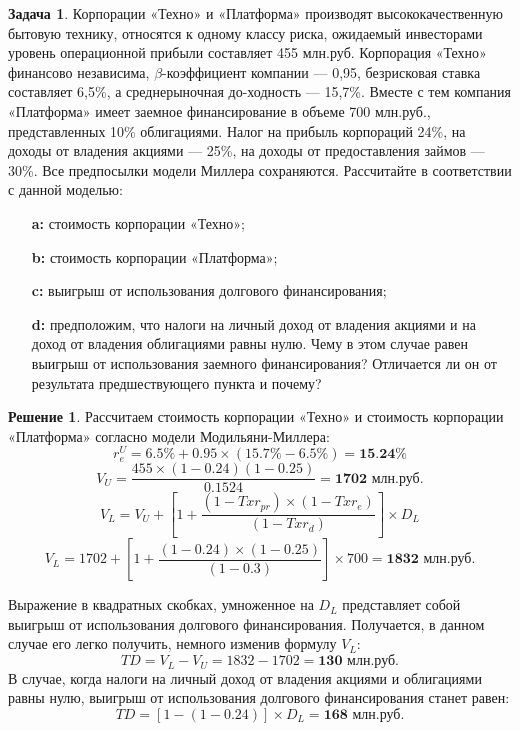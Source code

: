 \documentclass[a4paper, 14pt]{article}
\theoremstyle{plain} %
\theoremstyle{definition} %
\newtheorem*{solution}{Решение}
\newtheorem{problem}{Задача}[subsection]
\theoremstyle{remark} %
\begin{document}
\begin{problem}
	Корпорации «Техно» и «Платформа» производят высококачественную бытовую технику, относятся к одному классу риска, ожидаемый инвесторами уровень операционной прибыли составляет 455 млн.руб. Корпорация «Техно» финансово независима, $\beta$-коэффициент компании — 0,95, безрисковая ставка составляет 6,5\%, а среднерыночная до-ходность — 15,7\%. Вместе с тем компания «Платформа» имеет заемное финансирование в объеме 700 млн.руб., представленных 10\% облигациями. Налог на прибыль корпораций 24\%, на доходы от владения акциями — 25\%, на доходы от предоставления займов — 30\%. Все предпосылки модели Миллера сохраняются. Рассчитайте в соответствии с данной моделью:
	\begin{itemize}
		\item[\textbf{a:}] стоимость корпорации «Техно»;
		\item[\textbf{b:}] стоимость корпорации «Платформа»;
		\item[\textbf{c:}] выигрыш от использования долгового финансирования;
		\item[\textbf{d:}] предположим, что налоги на личный доход от владения акциями и на доход от владения облигациями равны нулю. Чему в этом случае равен выигрыш от использования заемного финансирования? Отличается ли он от результата предшествующего пункта и почему?
	\end{itemize}
	\begin{solution}
		Рассчитаем стоимость корпорации «Техно» и стоимость корпорации «Платформа» согласно модели Модильяни-Миллера:
		\[r_{e}^{U} = 6.5\% + 0.95 \times(15.7\%-6.5\%) = \textbf{15.24\%}\]
		\[V_{U} = \frac{455\times(1-0.24)(1-0.25)}{0.1524} = \textbf{1702 млн.руб.}\]
		\[V_{L} = V_{U} + \left[1 + \frac{(1-Txr_{pr})\times(1-Txr_{e})}{(1-Txr_{d})}\right]\times D_{L}\]
		\[V_{L} = 1702 + \left[1 + \frac{(1-0.24)\times(1-0.25)}{(1-0.3)}\right]\times 700 = \textbf{1832 млн.руб.}\]

		Выражение в квадратных скобках, умноженное на $D_{L}$ представляет собой выигрыш от использования долгового финансирования. Получается, в данном случае его легко получить, немного изменив формулу $V_{L}$:
		\[TD = V_{L} - V_{U} = 1832 - 1702 = \textbf{130 млн.руб.}\]
		В случае, когда налоги на личный доход от владения акциями и облигациями равны нулю, выигрыш от использования долгового финансирования станет равен:
		\[TD = \left[1-(1-0.24)\right]\times D_{L} = \textbf{168 млн.руб.}\]
	\end{solution}
\end{problem}
\end{document}
